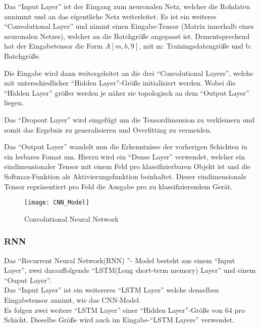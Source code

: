     \noindent
    Das "`Input Layer"' ist der Eingang zum neuronalen Netz, welcher die Rohdaten annimmt und an das eigentliche Netz weiterleitet. 
    Es ist ein weiteres "`Convolutional Layer"' und nimmt einen Eingabe-Tensor (Matrix innerhalb eines neuronalen Netzes), welcher an die Batchgröße angepasst ist.
    Dementsprechend hat der Eingabetensor die Form \( A[m, b, 9] \), mit m: Trainingsdatengröße und b: Batchgröße.
    \newline

    \noindent
    Die Eingabe wird dann weitergeleitet an die drei "`Convolutional Layers"', welche mit unterschiedlicher "`Hidden Layer"'-Größe initialisiert werden.
    Wobei die "`Hidden Layer"' größer werden je näher sie topologisch an dem "`Output Layer"' liegen.
    \newline

    \noindent
    Das "`Dropout Layer"' wird eingefügt um die Tensordimension zu verkleinern und somit das Ergebnis zu generalisieren und Overfitting zu vermeiden.
    \newline

    \noindent
    Das "`Output Layer"' wandelt nun die Erkenntnisse der vorherigen Schichten in ein lesbares Fomat um. 
    Hierzu wird ein "`Dense Layer"' verwendet, welcher ein eindimensionaler Tensor mit einem Feld pro klassifizierbaren Objekt ist und die Softmax-Funktion als Aktivierungsfunktion beinhaltet.
    Dieser eindimensionale Tensor repräsentiert pro Feld die Ausgabe pro zu klassifizierendem Gerät.     
    
    \begin{figure}[H]
        \centering
        \texttt{[image: CNN\_Model]}
        \caption{Convolutional Neural Network}
        \label{fig:CNN_MODEL}
    \end{figure}

    \subsubsection{RNN}
    Das "`Recurrent Neural Network(RNN) "'- Model besteht aus einem "`Input Layer"', zwei darauffolgende "`LSTM(Long short-term memory) Layer"' und einem "`Ouput Layer"'.\\
    \noindent
    Das "`Input Layer"' ist ein weitereres "`LSTM Layer"' welche denselben Eingabetensor annimt, wie das CNN-Model.\\
    \noindent
    Es folgen zwei weitere "`LSTM Layer"' einer "`Hidden Layer"'-Größe von 64 pro Schicht.
    Dieselbe Größe wird auch im Eingabe-"`LSTM Layers"' verwendet.
    \newline

